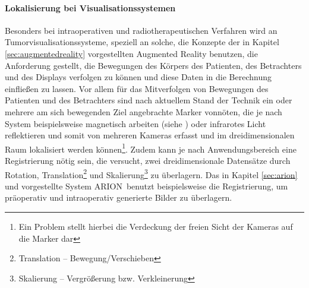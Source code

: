 \documentclass[ngerman,pdftex,paper=A4,DIV=calc,titlepage,12pt]{scrartcl}
\newtheorem[L]{boxedDefinition}{Definition}
\begin{document}
\paragraph{Lokalisierung bei Visualisationssystemen}
Besonders bei intraoperativen und radiotherapeutischen Verfahren wird an Tumorvisualisationssysteme, speziell an solche, die Konzepte der in Kapitel \ref{sec:augmentedreality} vorgestellten Augmented Reality benutzen, die Anforderung gestellt, die Bewegungen des Körpers des Patienten, des Betrachters und des Displays verfolgen zu können und diese Daten in die Berechnung einfließen zu lassen. Vor allem für das Mitverfolgen von Bewegungen des Patienten und des Betrachters sind nach aktuellem Stand der Technik ein oder mehrere am sich bewegenden Ziel angebrachte Marker vonnöten, die je nach System beispielsweise magnetisch arbeiten (siehe \cite{Suthau2002DE}) oder infrarotes Licht reflektieren und somit von mehreren Kameras erfasst und im dreidimensionalen Raum lokalisiert werden können\footnote{Ein Problem stellt hierbei die Verdeckung der freien Sicht der Kameras auf die Marker dar}. Zudem kann je nach Anwendungsbereich eine Registrierung nötig sein, die versucht, zwei dreidimensionale Datensätze durch Rotation, Translation\footnote{Translation -- Bewegung/Verschieben} und Skalierung\footnote{Skalierung -- Vergrößerung bzw. Verkleinerung} zu überlagern. Das in Kapitel \vref{sec:arion} und \cite{Suthau2002DE} vorgestellte System ARION\texttrademark\ benutzt beispielsweise die Registrierung, um präoperativ und intraoperativ generierte Bilder zu überlagern.
\end{document}
